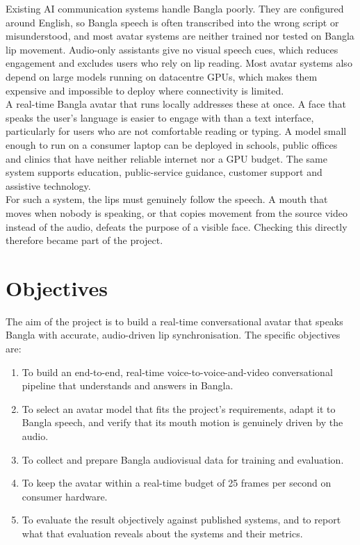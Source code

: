 Existing AI communication systems handle Bangla poorly. They are configured around English, so Bangla speech is often transcribed into the wrong script or misunderstood, and most avatar systems are neither trained nor tested on Bangla lip movement. Audio-only assistants give no visual speech cues, which reduces engagement and excludes users who rely on lip reading. Most avatar systems also depend on large models running on datacentre GPUs, which makes them expensive and impossible to deploy where connectivity is limited.\\

\noindent
A real-time Bangla avatar that runs locally addresses these at once. A face that speaks the user's language is easier to engage with than a text interface, particularly for users who are not comfortable reading or typing. A model small enough to run on a consumer laptop can be deployed in schools, public offices and clinics that have neither reliable internet nor a GPU budget. The same system supports education, public-service guidance, customer support and assistive technology.\\

\noindent
For such a system, the lips must genuinely follow the speech. A mouth that moves when nobody is speaking, or that copies movement from the source video instead of the audio, defeats the purpose of a visible face. Checking this directly therefore became part of the project.

\section{Objectives}
The aim of the project is to build a real-time conversational avatar that speaks Bangla with accurate, audio-driven lip synchronisation. The specific objectives are:

\begin{enumerate}
    \item To build an end-to-end, real-time voice-to-voice-and-video conversational pipeline that understands and answers in Bangla.
    \item To select an avatar model that fits the project's requirements, adapt it to Bangla speech, and verify that its mouth motion is genuinely driven by the audio.
    \item To collect and prepare Bangla audiovisual data for training and evaluation.
    \item To keep the avatar within a real-time budget of 25 frames per second on consumer hardware.
    \item To evaluate the result objectively against published systems, and to report what that evaluation reveals about the systems and their metrics.
\end{enumerate}


